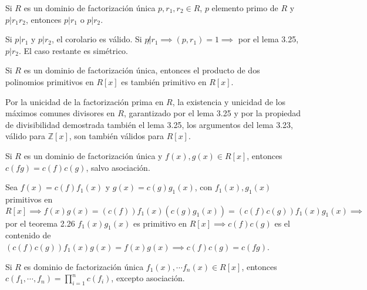 \begin{corolario}
    Si $R$ es un dominio de factorización única $p,r_1,r_2\in R$, $p$ elemento primo de $R$ y $p|r_1r_2$, entonces $p|r_1$ o $p|r_2$. 
    \begin{dem}
        Si $p|r_1$ y $p|r_2$, el corolario es válido. Si $p\not |r_1\implies (p,r_1)=1\implies$ por el lema 3.25, $p|r_2$. El caso restante es simétrico. 
    \end{dem}
\end{corolario}

\begin{lema}[3.26]
    Si $R$ es un dominio de factorización única, entonces el producto de dos polinomios primitivos en $R[x]$ es también primitivo en $R[x]$.
    \begin{dem}
        Por la unicidad de la factorización prima en $R$, la existencia y unicidad de los máximos comunes divisores en $R$, garantizado por el lema 3.25 y por la propiedad de divisibilidad demostrada también el lema 3.25, los argumentos del lema 3.23, válido para $\mathbb{Z}[x]$, son también válidos para $R[x]$. 
    \end{dem} 
\end{lema}

\begin{corolario}
    Si $R$ es un dominio de factorización única y $f(x),g(x)\in R[x]$, entonces $c(fg)=c(f)c(g)$, salvo asociación.
    \begin{dem}
        Sea $f(x)=c(f)f_1(x)$ y $g(x)=c(g)g_1(x)$, con $f_1(x),g_1(x)$ primitivos en $R[x]\implies f(x)g(x)=(c(f))f_1(x)(c(g)g_1(x))=(c(f)c(g))f_1(x)g_1(x)\implies$ por el teorema 2.26 $f_1(x)g_1(x)$ es primitivo en $R[x]\implies c(f)c(g)$ es el contenido de $(c(f)c(g))f_1(x)g(x)=f(x)g(x)\implies c(f)c(g)=c(fg)$.
    \end{dem}
\end{corolario}
\begin{corolario}
    Si $R$ es dominio de factorización única $f_1(x),\cdots f_n(x)\in R[x]$, entonces $c(f_1,\cdots,f_n)=\prod_{i=1}^nc(f_i)$, excepto asociación.
\end{corolario}

